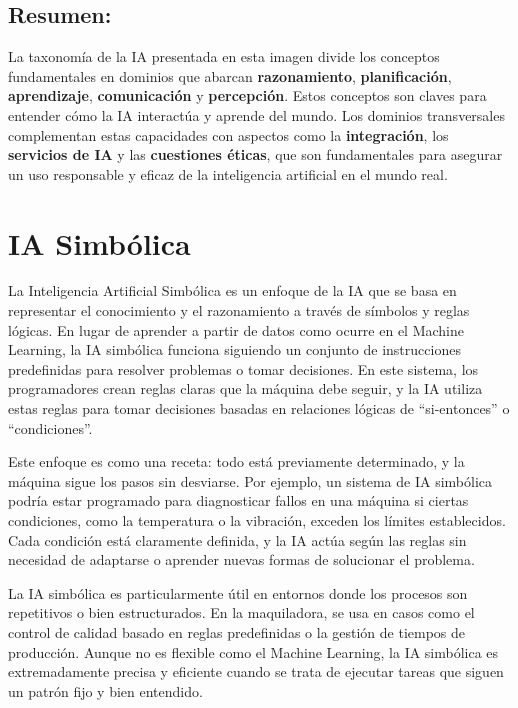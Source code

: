 \documentclass[
  10pt,
  letterpaper,
]{book}
\begin{document}
\subsection{Resumen:}\label{resumen}

La taxonomía de la IA presentada en esta imagen divide los conceptos
fundamentales en dominios que abarcan \textbf{razonamiento},
\textbf{planificación}, \textbf{aprendizaje}, \textbf{comunicación} y
\textbf{percepción}. Estos conceptos son claves para entender cómo la IA
interactúa y aprende del mundo. Los dominios transversales complementan
estas capacidades con aspectos como la \textbf{integración}, los
\textbf{servicios de IA} y las \textbf{cuestiones éticas}, que son
fundamentales para asegurar un uso responsable y eficaz de la
inteligencia artificial en el mundo real.

\section{IA Simbólica}\label{ia-simbuxf3lica}

La Inteligencia Artificial Simbólica es un enfoque de la IA que se basa
en representar el conocimiento y el razonamiento a través de símbolos y
reglas lógicas. En lugar de aprender a partir de datos como ocurre en el
Machine Learning, la IA simbólica funciona siguiendo un conjunto de
instrucciones predefinidas para resolver problemas o tomar decisiones.
En este sistema, los programadores crean reglas claras que la máquina
debe seguir, y la IA utiliza estas reglas para tomar decisiones basadas
en relaciones lógicas de ``si-entonces'' o ``condiciones''.

Este enfoque es como una receta: todo está previamente determinado, y la
máquina sigue los pasos sin desviarse. Por ejemplo, un sistema de IA
simbólica podría estar programado para diagnosticar fallos en una
máquina si ciertas condiciones, como la temperatura o la vibración,
exceden los límites establecidos. Cada condición está claramente
definida, y la IA actúa según las reglas sin necesidad de adaptarse o
aprender nuevas formas de solucionar el problema.

La IA simbólica es particularmente útil en entornos donde los procesos
son repetitivos o bien estructurados. En la maquiladora, se usa en casos
como el control de calidad basado en reglas predefinidas o la gestión de
tiempos de producción. Aunque no es flexible como el Machine Learning,
la IA simbólica es extremadamente precisa y eficiente cuando se trata de
ejecutar tareas que siguen un patrón fijo y bien entendido.
\end{document}
